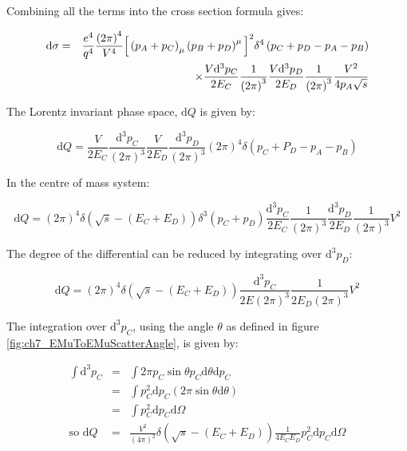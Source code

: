 Combining all the terms into the cross section formula gives:

\begin{eqnarray*}
  \mathrm{d}\sigma & = & \frac{e^4}{q^4}\frac{\left(2\pi\right)^4}{V^4}\Big[\left(p_A+p_C\right)_{\mu}\left(p_B+p_D\right)^{\mu}\Big]^2\delta^4\left(p_C+p_D-p_A-p_B\right) \\ 
  & & \times\frac{V\mathrm{d}^3p_C}{2E_C}\frac{1}{\left(2\pi\right)^3}\frac{V\mathrm{d}^3p_D}{2E_D}\frac{1}{\left(2\pi\right)^3}\frac{V^2}{4p_A\sqrt{s}}
\end{eqnarray*}

The Lorentz invariant phase space, $\mathrm{d}Q$ is given by:

\[
  \mathrm{d}Q = \frac{V}{2E_C}\frac{\mathrm{d}^3p_C}{\left(2\pi\right)^3}\frac{V}{2E_D}\frac{\mathrm{d}^3p_D}{\left(2\pi\right)^3}\left(2\pi\right)^4\delta\left(p_C+P_D-p_A-p_B\right)
\]

In the centre of mass system:

\[
  \mathrm{d}Q  = \left(2\pi\right)^4\delta\left(\sqrt{s}-\left(E_C+E_D\right)\right)\delta^3\left(p_C+p_D\right)\frac{\mathrm{d}^3p_C}{2E_C}\frac{1}{\left(2\pi\right)^3}\frac{\mathrm{d}^3p_D}{2E_D}\frac{1}{\left(2\pi\right)^3}V^2
\]

The degree of the differential can be reduced by integrating over $\mathrm{d}^3p_D$:

\[
  \mathrm{d}Q = \left(2\pi\right)^4\delta\left(\sqrt{s}-\left(E_C+E_D\right)\right)\frac{\mathrm{d}^3p_C}{2E\left(2\pi\right)^3}\frac{1}{2E_D\left(2\pi\right)^3}V^2
\]

The integration over $\mathrm{d}^3p_C$, using the angle $\theta$ as defined in figure \ref{fig:ch7_EMuToEMuScatterAngle}, is given by:

\begin{eqnarray*}
  \int\mathrm{d}^3p_C & = & \int 2\pi p_C\sin\theta p_C\mathrm{d}\theta\mathrm{d}p_C \\
  & = & \int p_C^2\mathrm{d}p_C \left(2\pi\sin\theta\mathrm{d}\theta\right) \\
  & = & \int p_C^2 \mathrm{d}p_C \mathrm{d}\Omega \\
  \textrm{so } \mathrm{d}Q & = & \frac{V^2}{\left(4\pi\right)^2} \delta\left(\sqrt{s}-\left(E_C + E_D\right)\right)\frac{1}{4E_CE_D}p_C^2 \mathrm{d}p_C\mathrm{d}\Omega
\end{eqnarray*}

